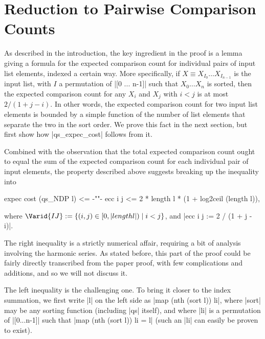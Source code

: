 \documentclass[runningheads]{llncs}
\begin{document}
\section{Reduction to Pairwise Comparison Counts}
\label{reduction}

As described in the introduction, the key ingredient in the proof is a lemma giving a formula for the expected comparison count for individual pairs of input list elements, indexed a certain way. More specifically, if $X \equiv X_{I_0} \ldots X_{I_{n-1}}$ is the input list, with $I$ a permutation of |[0 ... n-1]| such that $X_0 \ldots X_n$ is sorted, then the expected comparison count for any $X_i$ and $X_j$ with $i < j$ is at most $2 / (1 + j - i)$. In other words, the expected comparison count for two input list elements is bounded by a simple function of the number of list elements that separate the two in the sort order. We prove this fact in the next section, but first show how |qs_expec_cost| follows from it.

Combined with the observation that the total expected comparison count ought to equal the sum of the expected comparison count for each individual pair of input elements, the property described above suggests breaking up the inequality into
\begin{code}
  expec cost (qs_NDP l) <= {-""-} ecc i j <= 2 * length l * (1 + log2ceil (length l)),
\end{code}
where $\Varid{IJ} := \{ (i, j) \in [0, |length l|) \mid i < j \}$, and |ecc i j := 2 / (1 + j - i)|.

The right inequality is a strictly numerical affair, requiring a bit of analysis involving the harmonic series. As stated before, this part of the proof could be fairly directly transcribed from the paper proof, with few complications and additions, and so we will not discuss it.

The left inequality is the challenging one. To bring it closer to the index summation, we first write |l| on the left side as |map (nth (sort l)) li|, where |sort| may be any sorting function (including |qs| itself), and where |li| is a permutation of |[0...n-1]| such that |map (nth (sort l)) li = l| (such an |li| can easily be proven to exist).
\end{document}
